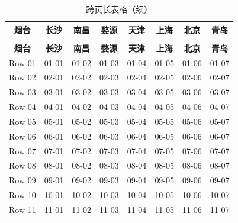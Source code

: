 \documentclass[
    report,     %
    oneside,    %
    UTF8,       %
    zihao=-4    %
]{config} %
\begin{document}
\renewcommand\arraystretch{0.85} %
\begin{longtable}{cccccccc}
    \caption{跨页长表格} \\ %
    
    \toprule[1.5pt]
        \textbf{烟台} & \textbf{长沙} & \textbf{南昌} & \textbf{婺源} & \textbf{天津} & \textbf{上海} & \textbf{北京} & \textbf{青岛} \\ %
    \midrule[0.75pt]
    \endfirsthead
    
    \caption[]{跨页长表格（续）} \\ %
    \toprule[1.5pt]
        \textbf{烟台} & \textbf{长沙} & \textbf{南昌} & \textbf{婺源} & \textbf{天津} & \textbf{上海} & \textbf{北京} & \textbf{青岛} \\  %
    \midrule[0.75pt]
    \endhead
        \bottomrule[1.5pt]
    \endfoot 
    \bottomrule[1.5pt]
    \endlastfoot
    \label{tab:longTable}
        Row 01 & 01-01 & 01-02 & 01-03 & 01-04 & 01-05 & 01-06 & 01-07 \\
        Row 02 & 02-01 & 02-02 & 02-03 & 02-04 & 02-05 & 02-06 & 02-07 \\
        Row 03 & 03-01 & 03-02 & 03-03 & 03-04 & 03-05 & 03-06 & 03-07 \\
        Row 04 & 04-01 & 04-02 & 04-03 & 04-04 & 04-05 & 04-06 & 04-07 \\
        Row 05 & 05-01 & 05-02 & 05-03 & 05-04 & 05-05 & 05-06 & 05-07 \\
        Row 06 & 06-01 & 06-02 & 06-03 & 06-04 & 06-05 & 06-06 & 06-07 \\
        Row 07 & 07-01 & 07-02 & 07-03 & 07-04 & 07-05 & 07-06 & 07-07 \\
        Row 08 & 08-01 & 08-02 & 08-03 & 08-04 & 08-05 & 08-06 & 08-07 \\
        Row 09 & 09-01 & 09-02 & 09-03 & 09-04 & 09-05 & 09-06 & 09-07 \\
        Row 10 & 10-01 & 10-02 & 10-03 & 10-04 & 10-05 & 10-06 & 10-07 \\
        Row 11 & 11-01 & 11-02 & 11-03 & 11-04 & 11-05 & 11-06 & 11-07 \\
\end{longtable}
\vspace{-0.5em}  %

\end{document}

